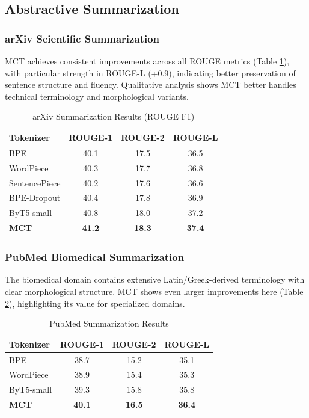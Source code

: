 \documentclass[conference]{IEEEtran}
\begin{document}
\subsection{Abstractive Summarization}

\subsubsection{arXiv Scientific Summarization}
MCT achieves consistent improvements across all ROUGE metrics (Table \ref{tab:arxiv}), with particular strength in ROUGE-L (+0.9), indicating better preservation of sentence structure and fluency. Qualitative analysis shows MCT better handles technical terminology and morphological variants.

\begin{table}[h]
\centering
\caption{arXiv Summarization Results (ROUGE F1)}
\label{tab:arxiv}
\begin{tabular}{lccc}
\toprule
\textbf{Tokenizer} & \textbf{ROUGE-1} & \textbf{ROUGE-2} & \textbf{ROUGE-L} \\
\midrule
BPE & 40.1 & 17.5 & 36.5 \\
WordPiece & 40.3 & 17.7 & 36.8 \\
SentencePiece & 40.2 & 17.6 & 36.6 \\
BPE-Dropout & 40.4 & 17.8 & 36.9 \\
ByT5-small & 40.8 & 18.0 & 37.2 \\
\textbf{MCT} & \textbf{41.2} & \textbf{18.3} & \textbf{37.4} \\
\bottomrule
\end{tabular}
\end{table}

\subsubsection{PubMed Biomedical Summarization}
The biomedical domain contains extensive Latin/Greek-derived terminology with clear morphological structure. MCT shows even larger improvements here (Table \ref{tab:pubmed}), highlighting its value for specialized domains.

\begin{table}[h]
\centering
\caption{PubMed Summarization Results}
\label{tab:pubmed}
\begin{tabular}{lccc}
\toprule
\textbf{Tokenizer} & \textbf{ROUGE-1} & \textbf{ROUGE-2} & \textbf{ROUGE-L} \\
\midrule
BPE & 38.7 & 15.2 & 35.1 \\
WordPiece & 38.9 & 15.4 & 35.3 \\
ByT5-small & 39.3 & 15.8 & 35.8 \\
\textbf{MCT} & \textbf{40.1} & \textbf{16.5} & \textbf{36.4} \\
\bottomrule
\end{tabular}
\end{table}
\end{document}
